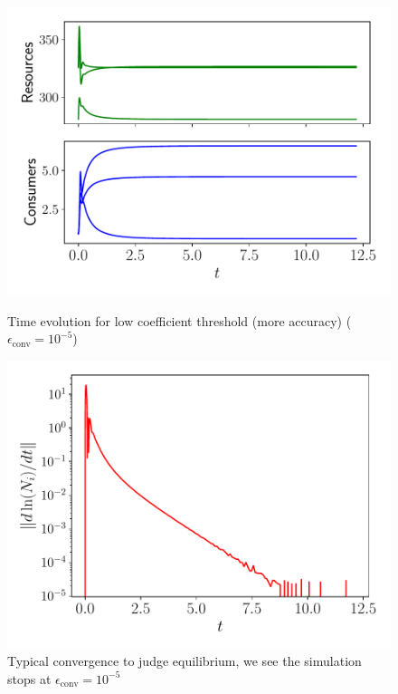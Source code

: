 \documentclass[12pt, titlepage]{report}
\begin{document}
\begin{figure}[h!]
\centering
\includegraphics[width=0.6\linewidth]{Typical_time_evolution/Typical_time_evolution_resources_species_low_threshold.pdf}
\caption{Time evolution for low coefficient threshold (more accuracy) ($\epsilon_{\text{conv}}=10^{-5}$)}
\includegraphics[width=0.6\linewidth]{figures/Typical_time_evolution/Typical_time_evolution_log_derivative_low_threshold.pdf}
\caption{Typical convergence to judge equilibrium, we see the simulation stops at $\epsilon_{\text{conv}}=10^{-5}$}
\end{figure}
\end{document}
